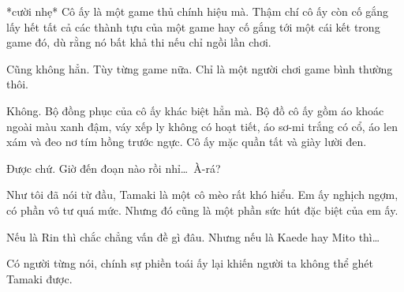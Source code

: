 \documentclass[../main.tex]{subfiles}
\begin{document}
*cười nhẹ* Cô ấy là một game thủ chính hiệu mà. Thậm chí cô ấy còn cố gắng lấy hết tất cả các thành tựu của một game hay cố gắng tới một cái kết trong game đó, dù rằng nó bất khả thi nếu chỉ ngồi lần chơi.


Cũng không hẳn. Tùy từng game nữa. Chỉ là một người chơi game bình thường thôi.


Không. Bộ đồng phục của cô ấy khác biệt hẳn mà. Bộ đồ cô ấy gồm áo khoác ngoài màu xanh đậm, váy xếp ly không có hoạt tiết, áo sơ-mi trắng có cổ, áo len xám và đeo nơ tím hồng trước ngực. Cô ấy mặc quần tất và giày lười đen.


\chrint



Được chứ. Giờ đến đoạn nào rồi nhỉ\dots\ À-rá?



Như tôi đã nói từ đầu, Tamaki là một cô mèo rất khó hiểu. Em ấy nghịch ngợm, có phần vô tư quá mức. Nhưng đó cũng là một phần sức hút đặc biệt của em ấy.





Nếu là Rin thì chắc chẳng vấn đề gì đâu. Nhưng nếu là Kaede hay Mito thì\dots


Có người từng nói, chính sự phiền toái ấy lại khiến người ta không thể ghét Tamaki được.

\end{document}
